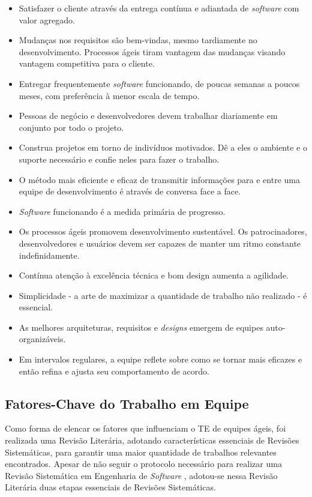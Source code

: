 \begin{itemize}
 \item Satisfazer o cliente através da entrega contínua e adiantada de \textit{software} com valor agregado.
 \item Mudanças nos requisitos são bem-vindas, mesmo tardiamente no desenvolvimento. Processos ágeis tiram vantagem das mudanças visando vantagem
competitiva para o cliente.
 \item Entregar frequentemente \textit{software} funcionando, de poucas semanas a poucos meses, com preferência à menor escala de tempo.
 \item Pessoas de negócio e desenvolvedores devem trabalhar diariamente em conjunto por todo o projeto.
 \item Construa projetos em torno de indivíduos motivados. Dê a eles o ambiente e o suporte necessário e confie neles para fazer o trabalho.
 \item O método mais eficiente e eficaz de transmitir informações para e entre uma equipe de desenvolvimento é através de conversa face a face.
 \item \textit{Software} funcionando é a medida primária de progresso.
 \item Os processos ágeis promovem desenvolvimento sustentável. Os patrocinadores, desenvolvedores e usuários devem ser capazes de manter um ritmo
constante indefinidamente.
 \item Contínua atenção à excelência técnica e bom design aumenta a agilidade.
 \item Simplicidade - a arte de maximizar a quantidade de trabalho não realizado - é essencial.
 \item As melhores arquiteturas, requisitos e \textit{designs} emergem de equipes auto-organizáveis.
 \item Em intervalos regulares, a equipe reflete sobre como se tornar mais eficazes e então refina e ajusta seu comportamento de acordo.
\end{itemize}

\subsection{Fatores-Chave do Trabalho em Equipe}
\label{fundamentacao:ageis:fatores}

Como forma de elencar os fatores que influenciam o TE de equipes ágeis, foi realizada uma Revisão Literária, adotando características essenciais de Revisões Sistemáticas, para garantir uma maior quantidade de trabalhos relevantes encontrados. Apesar de não seguir o protocolo necessário para realizar uma Revisão Sistemática em Engenharia de \textit{Software} \cite{kitchenhan}, adotou-se nessa Revisão Literária duas etapas essenciais de Revisões Sistemáticas.

